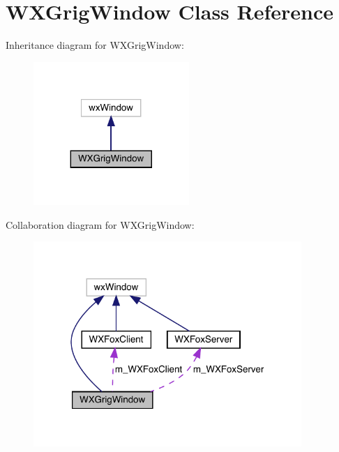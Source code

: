 \hypertarget{class_w_x_grig_window}{}\section{W\+X\+Grig\+Window Class Reference}
\label{class_w_x_grig_window}


Inheritance diagram for W\+X\+Grig\+Window\+:
\nopagebreak
\begin{figure}[H]
\begin{center}
\leavevmode
\includegraphics[width=167pt]{class_w_x_grig_window__inherit__graph}
\end{center}
\end{figure}


Collaboration diagram for W\+X\+Grig\+Window\+:
\nopagebreak
\begin{figure}[H]
\begin{center}
\leavevmode
\includegraphics[width=288pt]{class_w_x_grig_window__coll__graph}
\end{center}
\end{figure}
